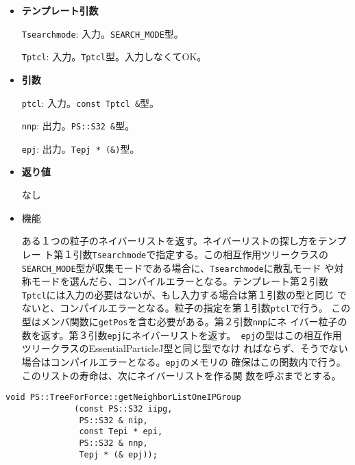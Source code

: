 \begin{itemize}

\item{{\bf テンプレート引数}}

{\tt Tsearchmode}: 入力。{\tt SEARCH\_MODE}型。

{\tt Tptcl}: 入力。{\tt Tptcl}型。入力しなくてOK。

\item{{\bf 引数}}

{\tt ptcl}: 入力。{\tt const Tptcl \&}型。

{\tt nnp}: 出力。{\tt PS::S32 \&}型。

{\tt epj}: 出力。{\tt Tepj * (\&)}型。

\item{{\bf 返り値}}

なし

\item 機能

ある１つの粒子のネイバーリストを返す。ネイバーリストの探し方をテンプレー
ト第１引数{\tt Tsearchmode}で指定する。この相互作用ツリークラスの{\tt
SEARCH\_MODE}型が収集モードである場合に、{\tt Tsearchmode}に散乱モード
や対称モードを選んだら、コンパイルエラーとなる。テンプレート第２引数
{\tt Tptcl}には入力の必要はないが、もし入力する場合は第１引数の型と同じ
でないと、コンパイルエラーとなる。粒子の指定を第１引数{\tt ptcl}で行う。
この型はメンバ関数に{\tt getPos}を含む必要がある。第２引数{\tt nnp}にネ
イバー粒子の数を返す。第３引数{\tt epj}にネイバーリストを返す。{\tt
epj}の型はこの相互作用ツリークラスのEssentialParticleJ型と同じ型でなけ
ればならず、そうでない場合はコンパイルエラーとなる。{\tt epj}のメモリの
確保はこの関数内で行う。このリストの寿命は、次にネイバーリストを作る関
数を呼ぶまでとする。

\end{itemize}

\begin{screen}
\begin{verbatim}
void PS::TreeForForce::getNeighborListOneIPGroup
              (const PS::S32 iipg,
               PS::S32 & nip,
               const Tepi * epi,
               PS::S32 & nnp,
               Tepj * (& epj));
\end{verbatim}
\end{screen}

